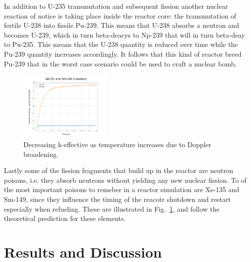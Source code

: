 \documentclass[twocolumn,a4paper,10pt]{article}
\begin{document}
\par
In addition to U-235 transmutation and subsequent fission another nuclear reaction of notice is taking place inside the reactor core: the transmutation of fertile U-238 into fissile Pu-239. This means that U-238 absorbs a neutron and becomes U-239, which in turn beta-deacys to Np-239 that will in turn beta-deay to Pu-235. This means that the U-238 quantity is reduced over time while the Pu-239 quantity increases accordingly. It follows that this kind of reactor breed Pu-239 that in the worst case scenario could be used to craft a nuclear bomb.

\begin{figure}[ht]
  \centering
  \includegraphics[width=0.4\textwidth]{../Pictures/Depletion_Xe135_Sm149.png}
  \caption{Decreasing k-effective as temperature increases due to Doppler broadening.}
  \label{fig:Xe135andSm149}
\end{figure}

\par
Lastly some of the fission fragments that build up in the reactor are neutron poisons, i.e. they absorb neutrons without yielding any new nuclear fission. To of the most important poisons to remeber in a reactor simulation are Xe-135 and Sm-149, since they influence the timing of the reacotr shutdown and restart especially when refueling. These are illustrated in Fig.~\ref{fig:Xe135andSm149}, and follow the theoretical prediction for these elements.


\section{Results and Discussion}
\label{sec:Results and Discussion}
\end{document}
